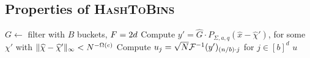 \subsection{Properties of \textsc{HashToBins}}\label{sec:hash2bins}
\begin{algorithm}
\caption{Hashing using Fourier samples (analyzed in Lemma~\ref{l:hashtobins})}\label{alg:hash2bins} 
\begin{algorithmic}[1] 
\State $G \gets$ filter with $B$ buckets, $F=2d$
\State Compute $y'=\hat G\cdot P_{\Sigma, a, q}(\hat x-\hat \chi')$,
for some $\chi'$ with $\lVert\widehat{\chi}-\widehat{\chi}'\rVert_{\infty}<N^{-\Omega(c)}$
\State Compute $u_j = \sqrt{N}\mathcal{F}^{-1}(y')_{(n/b)\cdot j}$ for $j \in [b]^d$
 $u$
\EndProcedure 
\end{algorithmic}
\end{algorithm}

